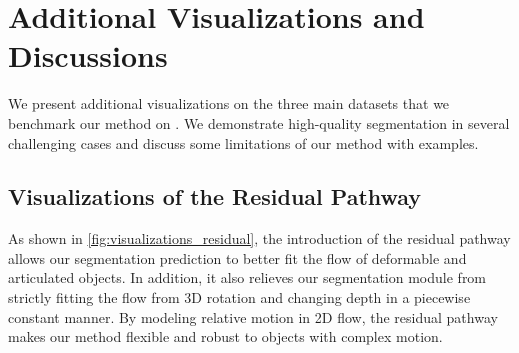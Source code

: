 \def\algHyperparamTuning#1{
\begin{algorithm}[#1]
\caption{Pseudo-code for using motion-appearance alignment for hyperparameter tuning}
\label{alg:hyperparameter-tuning}
\begin{algorithmic}
\Require A set of frames $\{I\}$ with $N$ frames
\Require A set of settings with different hyperparameter values $\{S\}$
\Ensure A chosen optimal setting $S^*$ according to motion-appearance-alignment
\For{each setting $S$ in $\{S\}$}
\State Train a model with setting $S$
\State Obtain prediction masks $\{M\}$ with trained model
\For{each frame-mask pair ($I_i$, $M_i$) in $\{I\}, \{M\}$}
    \State Calculate affinity $A$ from frozen ViT features:
    \State $A_{ij}=\mathbb{1}(\text{sim}(f_\text{aux}(I_t)_i, f_\text{aux}(I_t)_j) \geq 0.2)$
    \State Calculate cut between the predicted foreground and background $\text{Cut}(A, \vec{x})$:
    \State $\vec{x} \gets \text{Flatten}(M_i)$
    \State $\text{Cut}(A, \vec{x}) = (1-\vec{x}) A \vec{x}$
    \State Calculate normalized cut between the predicted foreground and background $\text{NCut}(A, \vec{x})$:
    \State $\text{NCut}(A, \vec{x}) = \frac{\text{Cut}(A, \vec{x})}{\sum_{i=1}^{HW} (A\vec{x})_i}
        + \frac{\text{Cut}(A, \vec{x})}{\sum_{i=1}^{HW} (A(1-\vec{x}))_i}$
    \State Calculate the motion-appearance alignment for the current frame:
    \State $L_i \gets -\text{NCut}(A, \vec{x})$
\EndFor
\State $L_{S} \gets \frac{1}{N}\sum_{i=1}^N L_i$
\EndFor
\State $S^* = \arg \max_{S} L_S$
\end{algorithmic}
\end{algorithm}
}



\section{Additional Visualizations and Discussions}
We present additional visualizations on the three main datasets that we benchmark our method on \cite{perazzi2016benchmark,li2013video,brox2010freiburg,ochs2013segmentation}. We demonstrate high-quality segmentation in several challenging cases and discuss some limitations of our method with examples.

\subsection{Visualizations of the Residual Pathway}
As shown in \cref{fig:visualizations_residual}, the introduction of the residual pathway allows our segmentation prediction to better fit the flow of deformable and articulated objects. In addition, it also relieves our segmentation module from strictly fitting the flow from 3D rotation and changing depth in a piecewise constant manner. By modeling relative motion in 2D flow, the residual pathway makes our method flexible and robust to objects with complex motion.


